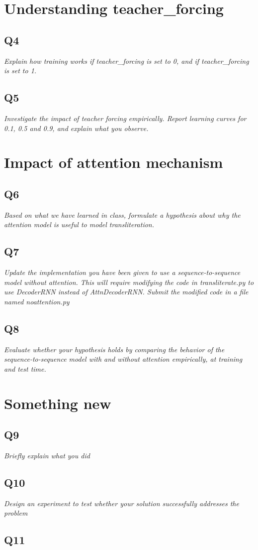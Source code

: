 \documentclass[12pt]{article}
\begin{document}
\section{Understanding teacher\_forcing}

\subsection{Q4}
\textit{
Explain how training works if teacher\_forcing is set to 0, and if teacher\_forcing is set to 1.
}

\subsection{Q5}
\textit{
Investigate the impact of teacher forcing empirically. Report learning curves for 0.1, 0.5 and 0.9, and explain what you observe.
}


\section{Impact of attention mechanism}

\subsection{Q6}
\textit{
Based on what we have learned in class, formulate a hypothesis about why the attention model is useful to model transliteration.	
}

\subsection{Q7}
\textit{
Update the implementation you have been given to use a sequence-to-sequence model without attention.  This will require modifying the code in transliterate.py to use DecoderRNN instead of AttnDecoderRNN.  Submit the modified code in a file named noattention.py
}

\subsection{Q8}
\textit{
Evaluate whether your hypothesis holds by comparing the behavior of the sequence-to-sequence model with and without attention empirically, at training and test time.
}

\section{Something new}

\subsection{Q9}
\textit{Briefly explain what you did}

\subsection{Q10}
\textit{Design an experiment to test whether your solution successfully addresses the problem}

\subsection{Q11}
\textit{}
\end{document}
